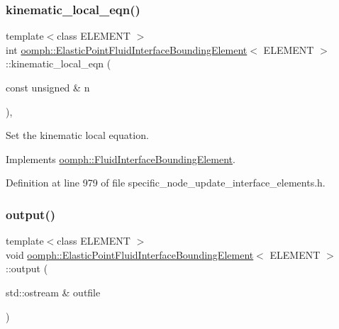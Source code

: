 \subsubsection{\texorpdfstring{kinematic\+\_\+local\+\_\+eqn()}{kinematic\_local\_eqn()}}
{\footnotesize\ttfamily template$<$class E\+L\+E\+M\+E\+NT $>$ \\
int \hyperlink{classoomph_1_1ElasticPointFluidInterfaceBoundingElement}{oomph\+::\+Elastic\+Point\+Fluid\+Interface\+Bounding\+Element}$<$ E\+L\+E\+M\+E\+NT $>$\+::kinematic\+\_\+local\+\_\+eqn (\begin{DoxyParamCaption}\item[{const unsigned \&}]{n }\end{DoxyParamCaption})\hspace{0.3cm}{\ttfamily [inline]}, {\ttfamily [virtual]}}



Set the kinematic local equation. 



Implements \hyperlink{classoomph_1_1FluidInterfaceBoundingElement_a12a0a6d7c3c1c1a5a0f42a57e60eab34}{oomph\+::\+Fluid\+Interface\+Bounding\+Element}.



Definition at line 979 of file specific\+\_\+node\+\_\+update\+\_\+interface\+\_\+elements.\+h.

\mbox{\label{classoomph_1_1ElasticPointFluidInterfaceBoundingElement_a3a09e94ba3bf5ce0922bc4b75097078c}} 
\subsubsection{\texorpdfstring{output()}{output()}\hspace{0.1cm}{\footnotesize\ttfamily [1/4]}}
{\footnotesize\ttfamily template$<$class E\+L\+E\+M\+E\+NT $>$ \\
void \hyperlink{classoomph_1_1ElasticPointFluidInterfaceBoundingElement}{oomph\+::\+Elastic\+Point\+Fluid\+Interface\+Bounding\+Element}$<$ E\+L\+E\+M\+E\+NT $>$\+::output (\begin{DoxyParamCaption}\item[{std\+::ostream \&}]{outfile }\end{DoxyParamCaption})\hspace{0.3cm}{\ttfamily [inline]}}



